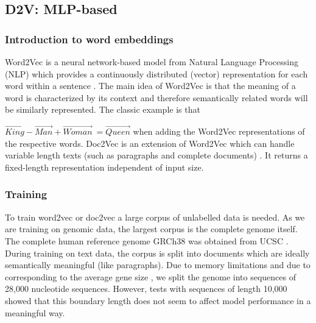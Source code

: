 \subsection{D2V: MLP-based} \label{subsec:d2v}
\subsubsection{Introduction to word embeddings}
Word2Vec is a neural network-based model from Natural Language Processing (NLP) which provides a continuously distributed (vector) representation for each word within a sentence \cite{w2v1}\cite{w2v2}. The main idea of Word2Vec is that the meaning of a word is characterized by its context and therefore semantically related words will be similarly represented. The classic example is that


$\vec{King} - \vec{Man} + \vec{Woman} ~= \vec{Queen}$
when adding the Word2Vec representations of the respective words.
Doc2Vec is an extension of Word2Vec which can handle variable length texts (such as paragraphs and complete documents) \cite{d2v1} \cite{d2v2}. It returns a fixed-length representation independent of input size.

\subsubsection{Training}
To train word2vec or doc2vec a large corpus of unlabelled data is needed. As we are training on genomic data, the largest corpus is the complete genome itself. The complete human reference genome GRCh38 \cite{hg38} was obtained from UCSC \cite{ucsc}.\\ %
During training on text data, the corpus is split into documents which are ideally semantically meaningful (like paragraphs). Due to memory limitations and due to corresponding to the average gene size \cite{bionumbers}, we split the genome into sequences of 28,000 nucleotide sequences. However, tests with sequences of length 10,000 showed that this boundary length does not seem to affect model performance in a meaningful way.
